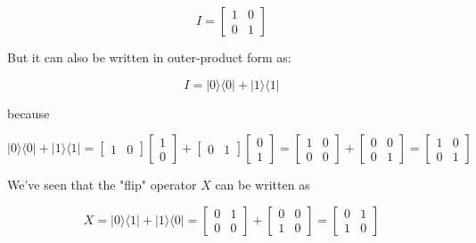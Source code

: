 \documentclass[main.tex]{subfiles}
\begin{document}
    $$
    I=\left[\begin{array}{ll}
    1 & 0 \\
    0 & 1
    \end{array}\right]
    $$
    
    But it can also be written in outer-product form as:
    
    $$
    I=|0\rangle\langle 0|+| 1\rangle\langle 1|
    $$
    
    because
    
    $$
    |0\rangle\langle 0|+| 1\rangle\langle 1|=\left[\begin{array}{ll}
    1 & 0
    \end{array}\right]\left[\begin{array}{l}
    1 \\
    0
    \end{array}\right]+\left[\begin{array}{ll}
    0 & 1
    \end{array}\right]\left[\begin{array}{l}
    0 \\
    1
    \end{array}\right]=\left[\begin{array}{ll}
    1 & 0 \\
    0 & 0
    \end{array}\right]+\left[\begin{array}{ll}
    0 & 0 \\
    0 & 1
    \end{array}\right]=\left[\begin{array}{ll}
    1 & 0 \\
    0 & 1
    \end{array}\right]
    $$
    
    We've seen that the "flip" operator $X$ can be written as
    
    $$
    X=|0\rangle\langle 1|+| 1\rangle\langle 0|=\left[\begin{array}{ll}
    0 & 1 \\
    0 & 0
    \end{array}\right]+\left[\begin{array}{ll}
    0 & 0 \\
    1 & 0
    \end{array}\right]=\left[\begin{array}{ll}
    0 & 1 \\
    1 & 0
    \end{array}\right]
    $$
    
\end{document}
